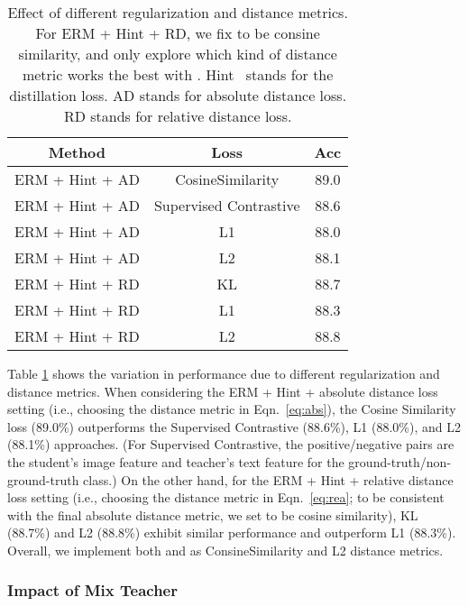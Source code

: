 \documentclass[10pt,twocolumn,letterpaper]{article}
\begin{document}
\begin{table}[htbp]
\begin{center}
\footnotesize
\begin{tabular}{c |  c |c }
\hline
Method & Loss & Acc \\
\hline \hline
\rowcolor{lightgray!30}ERM + Hint + AD & CosineSimilarity & 89.0\\
ERM + Hint + AD & Supervised Contrastive & 88.6\\
ERM + Hint + AD & L1 & 88.0\\
ERM + Hint + AD & L2 & 88.1\\
\hline
ERM + Hint + RD & KL & 88.7\\
ERM + Hint + RD & L1 & 88.3\\
\rowcolor{lightgray!30}ERM + Hint + RD & L2 & 88.8\\
\hline 
\end{tabular}
\vspace{5pt}
\caption{Effect of different regularization and distance metrics. For ERM + Hint + RD, we fix  to be consine similarity, and only explore which kind of distance metric  works the best with . Hint~\cite{hinton2015distilling} stands for the distillation loss. AD stands for absolute distance loss. RD stands for relative distance loss.}
\label{table:distance}
\end{center}
\end{table}

Table \ref{table:distance} shows the variation in performance due to different regularization and distance metrics. When considering the ERM + Hint + absolute distance loss setting (i.e., choosing the distance metric  in Eqn.~\ref{eq:abs}), the Cosine Similarity loss (89.0\%) outperforms the Supervised Contrastive (88.6\%), L1 (88.0\%), and L2 (88.1\%) approaches. (For Supervised Contrastive, the positive/negative pairs are the student's image feature and teacher's text feature for the ground-truth/non-ground-truth class.)  On the other hand, for the ERM + Hint + relative distance loss setting (i.e., choosing the distance metric  in Eqn.~\ref{eq:rea}; to be consistent with the final absolute distance metric, we set  to be cosine similarity), KL (88.7\%) and L2 (88.8\%) exhibit similar performance and outperform L1 (88.3\%). Overall, we implement both  and  as ConsineSimilarity and  L2 distance metrics. 

\subsubsection{Impact of Mix Teacher}
\end{document}
